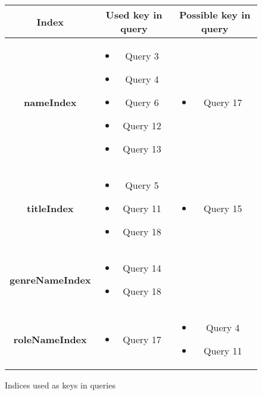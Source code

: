 \begin{figure}[ht]
	\centering
	\begin{tabular}{c|c|c}
		\textbf{Index} & \textbf{Used key in query} & \textbf{Possible key in query}\\
		\hline
		\textbf{nameIndex}
		&
			\parbox{3cm}{
				\begin{itemize}
					\item Query 3
					\item Query 4
					\item Query 6
					\item Query 12
					\item Query 13
				\end{itemize}
			}
		&
			\parbox{3cm}{
				\begin{itemize}
					\item Query 17
				\end{itemize}
			}
		\\\hline
		\textbf{titleIndex}
		&
			\parbox{3cm}{
				\begin{itemize}
					\item Query 5
					\item Query 11
					\item Query 18
				\end{itemize}
			}
		&
			\parbox{3cm}{
				\begin{itemize}
					\item Query 15
				\end{itemize}
			}
		\\\hline
		\textbf{genreNameIndex}
		&
			\parbox{3cm}{
				\begin{itemize}
					\item Query 14
					\item Query 18
				\end{itemize}
			}
		&
		\\\hline
		\textbf{roleNameIndex}
		&
			\parbox{3cm}{
				\begin{itemize}
					\item Query 17
				\end{itemize}
			}
		&
			\parbox{3cm}{
				\begin{itemize}
					\item Query 4
					\item Query 11
				\end{itemize}
			}
	\end{tabular}
	\caption{Indices used as keys in queries}
\end{figure}